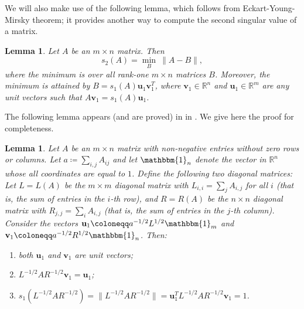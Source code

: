 \documentclass[reqno,a4paper]{amsart}
\newtheorem{lemma}[theorem]{Lemma}
\theoremstyle{definition}
\begin{document}
We will also make use of the following lemma, which follows from Eckart-Young-Mirsky theorem; it provides another way to compute the second singular value of a matrix.

\begin{lemma}\label{lem:low-rank-approximation}
Let $A$ be an $m \times n$
matrix. Then
\[
s_2(A)=\min_B\:\|{A-B}\|,
\]
where the minimum is over all rank-one $m\times n$ matrices $B$. Moreover, the minimum is attained by $B = s_1(A)\textbf{u}_1\textbf{v}^T_1$, where 
$\textbf{v}_1\in \mathbb{R}^n$ and $\textbf{u}_1\in \mathbb{R}^m$ are any unit vectors such that $A\textbf{v}_1=s_1(A)\textbf{u}_1$.
\end{lemma}

The following lemma appears (and are proved) in \cite{FHMV25} in \cite{FHMV25}. We give here the proof for completeness.

\begin{lemma} \label{obs: |N|}
    Let $A$ be an $m \times n$ matrix with non-negative entries without zero rows or columns.
    Let $a \coloneqq \sum_{i,j}A_{ij}$ and let $\mathbbm{1}_n$ denote the vector in $\mathbb{R}^n$ whose all coordinates are equal to $1$. Define the following two diagonal matrices: Let $L=L(A)$ be the $m\times m$ diagonal matrix with $L_{i,i}=\sum_{j}A_{i,j}$ for all $i$ (that is, the sum of entries in the $i$-th row), and $R=R(A)$ be the $n\times n$ diagonal matrix with $R_{j,j}=\sum_{i}A_{i,j}$ (that is, the sum of entries in the $j$-th column).  Consider the vectors $\textbf{u}_1 \coloneqq a^{-1/2} L^{1/2} \mathbbm{1}_m$ and $\textbf{v}_1 \coloneqq a^{-1/2} R^{1/2} \mathbbm{1}_n$. Then: 
    \begin{enumerate}
        \item both $\textbf{u}_1$ and $\textbf{v}_1$ are unit vectors;
        \item $L^{-1/2}AR^{-1/2} \textbf{v}_1=\textbf{u}_1$;
        \item $s_1(L^{-1/2}AR^{-1/2}) = \|{L^{-1/2}AR^{-1/2}}\| = \textbf{u}_1^T L^{-1/2}AR^{-1/2} \textbf{v}_1 = 1$.
    \end{enumerate}
\end{lemma}
\end{document}
